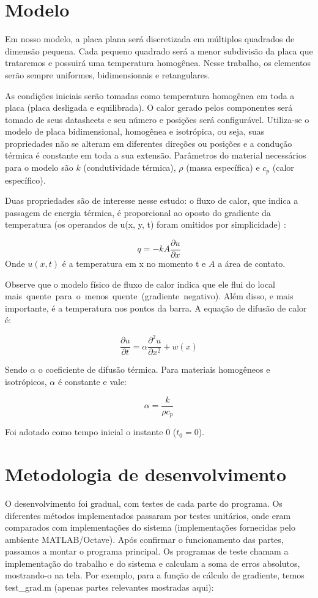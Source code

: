\documentclass[12pt,fleqn]{article}
\begin{document}
\section{Modelo}
Em nosso modelo, a placa plana será discretizada em múltiplos quadrados de dimensão pequena. Cada pequeno quadrado será a menor subdivisão da placa que trataremos e possuirá uma temperatura homogênea. Nesse trabalho, os elementos serão sempre uniformes, bidimensionais e retangulares.

As condições iniciais serão tomadas como temperatura homogênea em toda a placa (placa desligada e equilibrada). O calor gerado pelos componentes será tomado de seus datasheets e seu número e posições será configurável. Utiliza-se o modelo de placa bidimensional, homogênea e isotrópica, ou seja, suas propriedades não se alteram em diferentes direções ou posições e a condução térmica é constante em toda a sua extensão. Parâmetros do material necessários para o modelo são $k$ (condutividade térmica), $\rho$ (massa específica) e $c_p$ (calor específico).

Duas propriedades são de interesse nesse estudo: o fluxo de calor, que indica a passagem de energia térmica, é proporcional ao oposto do gradiente da temperatura (os operandos de u(x, y, t) foram omitidos por simplicidade) \cite{ufsc_geracao_de_calor}:

\[q = -k A \frac{\partial u}{\partial x}\]
Onde $u(x, t)$ é a temperatura em x no momento t e $A$ a área de contato.

Observe que o modelo físico de fluxo de calor indica que ele flui do local mais quente para o menos quente (gradiente negativo). Além disso, e mais importante, é a temperatura nos pontos da barra. A equação de difusão de calor é:

\[\frac{\partial u}{\partial t} = \alpha \frac{\partial^2 u}{\partial x^2} + w(x)\]

Sendo $\alpha$ o coeficiente de difusão térmica. Para materiais homogêneos e isotrópicos, $\alpha$ é constante e vale:

\[\alpha = \frac{k}{\rho c_p}\]

Foi adotado como tempo inicial o instante 0 ($t_0 = 0$).

\section{Metodologia de desenvolvimento}
O desenvolvimento foi gradual, com testes de cada parte do programa. Os diferentes métodos implementados passaram por testes unitários, onde eram comparados com implementações do sistema (implementações fornecidas pelo ambiente MATLAB/Octave). Após confirmar o funcionamento das partes, passamos a montar o programa principal. Os programas de teste chamam a implementação do trabalho e do sistema e calculam a soma de erros absolutos, mostrando-o na tela. Por exemplo, para a função de cálculo de gradiente, temos test\_grad.m (apenas partes relevantes mostradas aqui):
\end{document}
